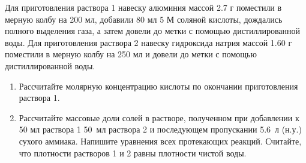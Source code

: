 
Для приготовления раствора 1 навеску алюминия массой 2.7 г поместили в мерную колбу на 200 мл, добавили 80 мл 5 М 
соляной кислоты, дождались полного выделения газа, а затем довели до метки с помощью дистиллированной воды. Для 
приготовления раствора 2 навеску гидроксида натрия массой 1.60 г поместили в мерную колбу на 250 мл и довели до 
метки с помощью дистиллированной воды.

\begin{enumerate}
    \item Рассчитайте молярную концентрацию кислоты по окончании приготовления раствора 1.
    \item Рассчитайте массовые доли солей в растворе, полученном при добавлении к 50 мл раствора 1 50~мл 
    раствора 2 и последующем пропускании 5.6~л (н.у.) сухого аммиака. Напишите уравнения всех протекающих реакций. 
    Считайте, что плотности растворов 1 и 2 равны плотности чистой воды.
\end{enumerate}